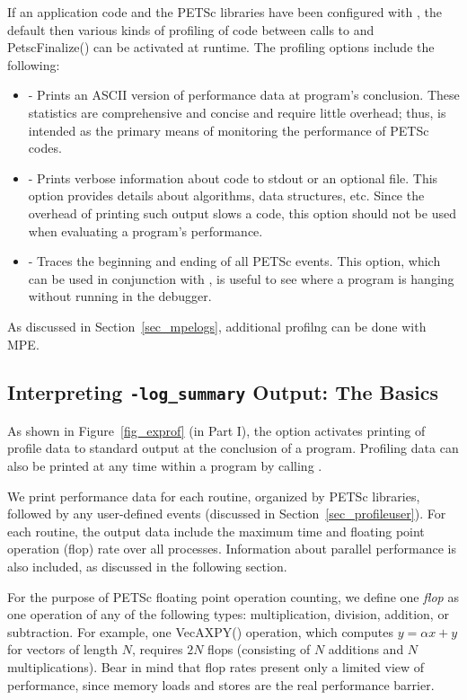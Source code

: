 If an application code and the PETSc libraries have been configured with
, the default
then various kinds of profiling of code between calls to  and PetscFinalize() can be 
activated at runtime.  The profiling options include the following:
 
\begin{itemize}
\item {} - Prints an ASCII version of performance data
     at program's conclusion. These statistics are comprehensive and concise
     and require little overhead; thus,  is intended as
     the primary means of monitoring the performance of PETSc codes.
\item {} - Prints verbose information about code to
     stdout or an optional file. This option provides details about algorithms,
     data structures, etc. Since the overhead of printing such output slows a
     code, this option should not be used when evaluating a program's performance.
\item {} - Traces the beginning and ending of all
     PETSc events.  This option, which can be used in conjunction with 
     , is useful to see where a program is hanging
     without running in the debugger.  
\end{itemize}
 As discussed in Section~\ref{sec_mpelogs},
additional profilng can be done with MPE.

\subsection{Interpreting {\tt -log\_summary} Output: The Basics}
\label{sec_ploginfo}

As shown in Figure~\ref{fig_exprof} (in Part I), the option   activates printing of profile
data to standard output at the conclusion of a program.  Profiling
data can also be printed at any time within a program by calling .

We print performance data for each routine, organized by PETSc
libraries, followed by any user-defined events (discussed in
Section~\ref{sec_profileuser}).  For each routine, the output data
include the maximum time and floating point operation (flop) rate over
all processes.  Information about parallel performance is also
included, as discussed in the following section.

For the purpose of PETSc floating point operation counting, we define
one {\em flop} as one operation of any of the following types:
multiplication, division, addition, or subtraction.  For example, one
VecAXPY() operation, which computes $y = \alpha x + y$ for
vectors of length $N$, requires $2N$ flops (consisting of $N$
additions and $N$ multiplications).  Bear in mind that flop rates
present only a limited view of performance, since memory loads and stores are
the real performance barrier.

